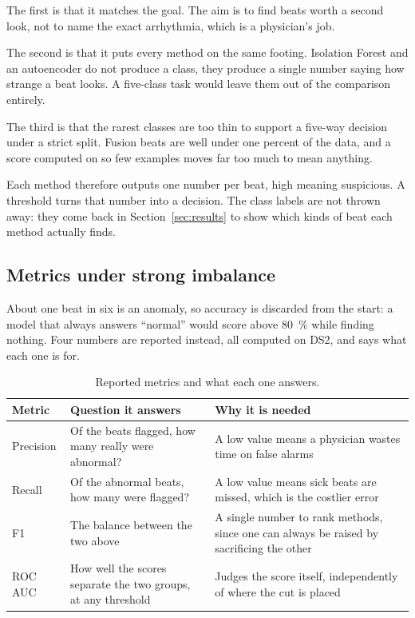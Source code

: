 \documentclass[a4paper, 12pt]{article}
\begin{document}
The first is that it matches the goal. The aim is to find beats worth a second
look, not to name the exact arrhythmia, which is a physician's job.

The second is that it puts every method on the same footing. Isolation Forest and
an autoencoder do not produce a class, they produce a single number saying how
strange a beat looks. A five-class task would leave them out of the comparison
entirely.

The third is that the rarest classes are too thin to support a five-way decision
under a strict split. Fusion beats are well under one percent of the data, and a
score computed on so few examples moves far too much to mean anything.

Each method therefore outputs one number per beat, high meaning suspicious. A
threshold turns that number into a decision. The class labels are not thrown away:
they come back in Section~\ref{sec:results} to show which kinds of beat each
method actually finds.


\subsection{Metrics under strong imbalance}\label{subsec:metrics}

About one beat in six is an anomaly, so accuracy is discarded from the start: a
model that always answers ``normal'' would score above \SI{80}{\percent} while
finding nothing. Four numbers are reported instead, all computed on DS2, and
 says what each one is for.

\begin{table}[htbp]
  \centering
  \small
  \caption{Reported metrics and what each one answers.}
  \label{tab:metrics}
  \begin{tabular}{@{}lp{}p{}@{}}
    \toprule
    \textbf{Metric} & \textbf{Question it answers} & \textbf{Why it is needed} \\
    \midrule
    Precision & Of the beats flagged, how many really were abnormal?
      & A low value means a physician wastes time on false alarms \\
    \addlinespace
    Recall & Of the abnormal beats, how many were flagged?
      & A low value means sick beats are missed, which is the costlier error \\
    \addlinespace
    F1 & The balance between the two above
      & A single number to rank methods, since one can always be raised by
        sacrificing the other \\
    \addlinespace
    ROC AUC & How well the scores separate the two groups, at any threshold
      & Judges the score itself, independently of where the cut is placed \\
    \bottomrule
  \end{tabular}
\end{table}
\end{document}
